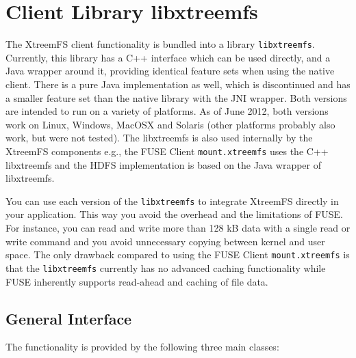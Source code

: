 \documentclass[a4paper,10pt]{book}
\begin{document}
\chapter{Client Library libxtreemfs}
\label{sec:libxtreemfs}

The XtreemFS client functionality is bundled into a library \texttt{libxtreemfs}. Currently, this library has a C++ interface which can be used directly, and a Java wrapper around it, providing identical feature sets when using the native client. There is a pure Java implementation as well, which is discontinued and has a smaller feature set than the native library with the JNI wrapper. Both versions are intended to run on a variety of platforms. As of June 2012, both versions work on Linux, Windows, MacOSX and Solaris (other platforms probably also work, but were not tested). The libxtreemfs is also used internally by the XtreemFS components e.g., the FUSE Client \texttt{mount.xtreemfs} uses the C++ libxtreemfs and the HDFS implementation is based on the Java wrapper of libxtreemfs.

You can use each version of the \texttt{libxtreemfs} to integrate XtreemFS directly in your application. This way you avoid the overhead and the limitations of FUSE. For instance, you can read and write more than 128 kB data with a single read or write command and you avoid unnecessary copying between kernel and user space. The only drawback compared to using the FUSE Client \texttt{mount.xtreemfs} is that the \texttt{libxtreemfs} currently has no advanced caching functionality while FUSE inherently supports read-ahead and caching of file data.

\section{General Interface}

The functionality is provided by the following three main classes:
\end{document}
